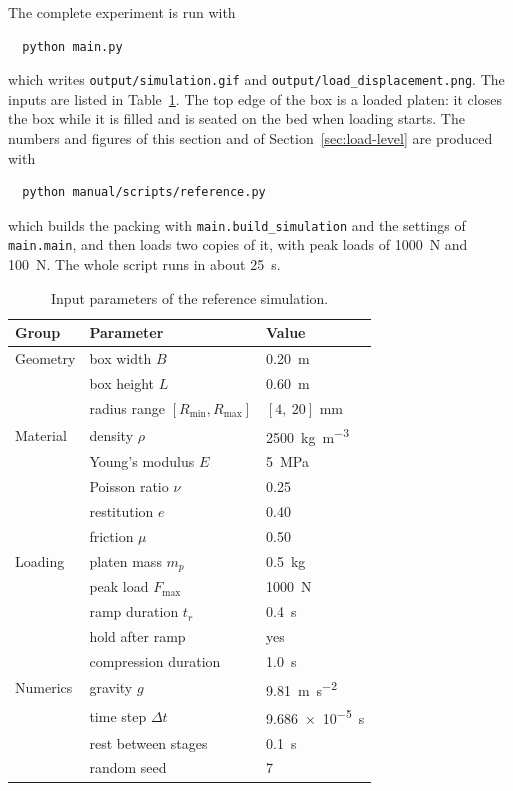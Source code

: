 The complete experiment is run with
\begin{verbatim}
  python main.py
\end{verbatim}
which writes \texttt{output/simulation.gif} and
\texttt{output/load\_displacement.png}.  The inputs are listed in
Table~\ref{tab:refsetup}.  The top edge of the box is a loaded platen: it
closes the box while it is filled and is seated on the bed when loading starts.
The numbers and figures of this section and of Section~\ref{sec:load-level} are
produced with
\begin{verbatim}
  python manual/scripts/reference.py
\end{verbatim}
which builds the packing with \texttt{main.build\_simulation} and the settings
of \texttt{main.main}, and then loads two copies of it, with peak loads of
\qty{1000}{\newton} and \qty{100}{\newton}.  The whole script runs in about
\qty{25}{\second}.

\begin{table}[htbp]
  \centering
  \caption{Input parameters of the reference simulation.}
  \label{tab:refsetup}
  \begin{tabular}{lll}
    \toprule
    Group & Parameter & Value \\
    \midrule
    Geometry & box width $B$          & \qty{0.20}{\metre} \\
             & box height $L$         & \qty{0.60}{\metre} \\
             & radius range $[R_{\min},R_{\max}]$ & $[4,\ 20]$ \unit{\milli\metre} \\
    \midrule
    Material & density $\rho$         & \qty{2500}{\kilogram\per\cubic\metre} \\
             & Young's modulus $E$    & \qty{5}{\mega\pascal} \\
             & Poisson ratio $\nu$    & 0.25 \\
             & restitution $e$        & 0.40 \\
             & friction $\mu$         & 0.50 \\
    \midrule
    Loading  & platen mass $m_{p}$    & \qty{0.5}{\kilogram} \\
             & peak load $F_{\max}$   & \qty{1000}{\newton} \\
             & ramp duration $t_{r}$  & \qty{0.4}{\second} \\
             & hold after ramp        & yes \\
             & compression duration   & \qty{1.0}{\second} \\
    \midrule
    Numerics & gravity $g$            & \qty{9.81}{\metre\per\second\squared} \\
             & time step $\Delta t$   & \qty{9.686e-5}{\second} \\
             & rest between stages    & \qty{0.1}{\second} \\
             & random seed            & 7 \\
    \bottomrule
  \end{tabular}
\end{table}

